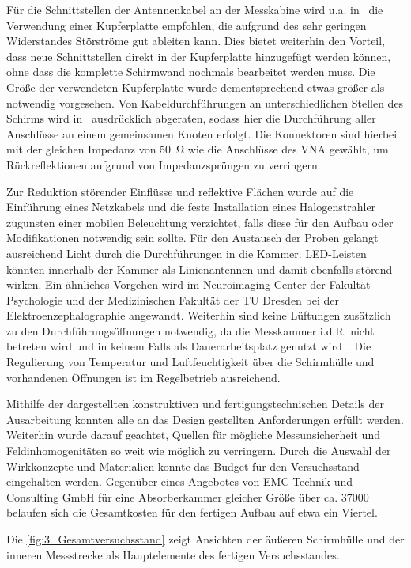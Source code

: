Für die Schnittstellen der Antennenkabel an der Messkabine wird u.a. in~\cite{EM_Schirmung, EMV} die Verwendung einer Kupferplatte empfohlen, die aufgrund des sehr geringen Widerstandes Störströme gut ableiten kann. Dies bietet weiterhin den Vorteil, dass neue Schnittstellen direkt in der Kupferplatte hinzugefügt werden können, ohne dass die komplette Schirmwand nochmals bearbeitet werden muss. Die Größe der verwendeten Kupferplatte wurde dementsprechend etwas größer als notwendig vorgesehen. Von Kabeldurchführungen an unterschiedlichen Stellen des Schirms wird in~\cite{EM_Schirmung, EMV, Design_of_shielded_enclosures} ausdrücklich abgeraten, sodass hier die Durchführung aller Anschlüsse an einem gemeinsamen Knoten erfolgt. Die Konnektoren sind hierbei mit der gleichen Impedanz von \SI{50}{\ohm} wie die Anschlüsse des \ac{VNA} gewählt, um Rückreflektionen aufgrund von Impedanzsprüngen zu verringern. 
\par
\vspace{\linespace}
Zur Reduktion störender Einflüsse und reflektive Flächen wurde auf die Einführung eines Netzkabels und die feste Installation eines Halogenstrahler zugunsten einer mobilen Beleuchtung verzichtet, falls diese für den Aufbau oder Modifikationen notwendig sein sollte. Für den Austausch der Proben gelangt ausreichend Licht durch die Durchführungen in die Kammer. LED-Leisten könnten innerhalb der Kammer als Linienantennen und damit ebenfalls störend wirken. Ein ähnliches Vorgehen wird im Neuroimaging Center der Fakultät Psychologie und der Medizinischen Fakultät der TU Dresden bei der Elektroenzephalographie angewandt. Weiterhin sind keine Lüftungen zusätzlich zu den Durchführungsöffnungen notwendig, da die Messkammer i.d.R. nicht betreten wird und in keinem Falls als Dauerarbeitsplatz genutzt wird~\cite{EM_Schirmung}. Die Regulierung von Temperatur und Luftfeuchtigkeit über die Schirmhülle und vorhandenen Öffnungen ist im Regelbetrieb ausreichend.  

    
\par
\vspace{\linespace}

Mithilfe der dargestellten konstruktiven und fertigungstechnischen Details der Ausarbeitung konnten alle an das Design gestellten Anforderungen erfüllt werden. Weiterhin wurde darauf geachtet, Quellen für mögliche Messunsicherheit und Feldinhomogenitäten so weit wie möglich zu verringern. Durch die Auswahl der Wirkkonzepte und Materialien konnte das Budget für den Versuchsstand eingehalten werden. Gegenüber eines Angebotes von EMC Technik und Consulting GmbH für eine Absorberkammer gleicher Größe über ca. \SI{37000}{\text{\euro}} belaufen sich die Gesamtkosten für den fertigen Aufbau auf etwa ein Viertel. 
\par
\vspace{\linespace}
Die \Abb\ref{fig:3_Gesamtversuchsstand} zeigt Ansichten der äußeren Schirmhülle und der inneren Messstrecke als Hauptelemente des fertigen Versuchsstandes.

